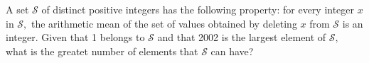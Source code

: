 A set $\mathcal{S}$ of distinct positive integers has the following property: for every integer $x$ in $\mathcal{S},$ the arithmetic mean of the set of values obtained by deleting $x$ from $\mathcal{S}$ is an integer.  Given that 1 belongs to $\mathcal{S}$ and that 2002 is the largest element of $\mathcal{S},$ what is the greatet number of elements that $\mathcal{S}$ can have?